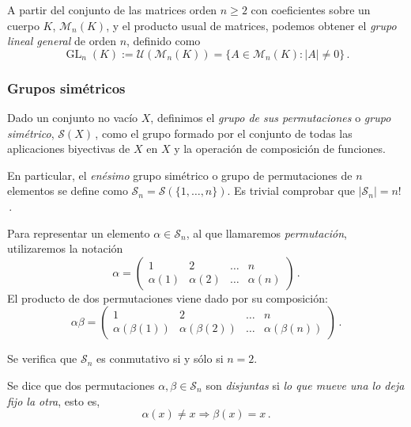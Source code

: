 A partir del conjunto de las matrices orden $n \geq 2$ con coeficientes sobre un cuerpo $K$, $\mathcal M_n(K)$, y el producto usual de matrices, podemos obtener el \textit{grupo lineal general} de orden $n$, definido como \begin{equation*}
  \operatorname{GL}_n(K) := \mathcal U(\mathcal M_n(K)) = \{A \in \mathcal M_n(K) : |A| \neq 0\}\,.
\end{equation*}

\subsubsection{Grupos simétricos}

Dado un conjunto no vacío $X$, definimos el \textit{grupo de sus permutaciones} o \textit{grupo simétrico}, $\mathcal S(X)$\,, como el grupo formado por el conjunto de todas las aplicaciones biyectivas de $X$ en $X$ y la operación de composición de funciones.

En particular, el \textit{enésimo} grupo simétrico o grupo de permutaciones de $n$ elementos se define como $\mathcal S_n = \mathcal S\left(\{1,\dots,n\}\right)$. Es trivial comprobar que $|\mathcal S_n| = n!$\,.

Para representar un elemento $\alpha \in \mathcal S_n$, al que llamaremos \textit{permutación}, utilizaremos la notación \begin{equation*}
  \alpha = \begin{pmatrix}
    1 & 2 & \hdots & n \\
    \alpha(1) & \alpha(2) & \hdots & \alpha(n) 
  \end{pmatrix}\,.
\end{equation*}
El producto de dos permutaciones viene dado por su composición: \begin{equation*}
  \alpha \beta = \begin{pmatrix}
    1 & 2 & \hdots & n \\
    \alpha(\beta(1)) & \alpha(\beta(2)) & \hdots & \alpha(\beta(n))
  \end{pmatrix}\,.
\end{equation*}

Se verifica que $\mathcal S_n$ es conmutativo si y sólo si $n=2$.

\begin{ndef}
Se dice que dos permutaciones $\alpha,\beta \in \mathcal S_n$ son \textit{disjuntas} si \textit{lo que mueve una lo deja fijo la otra}, esto es, \begin{equation*}
  \alpha(x) \neq x \Rightarrow \beta(x) = x\,.
\end{equation*}
\end{ndef}

